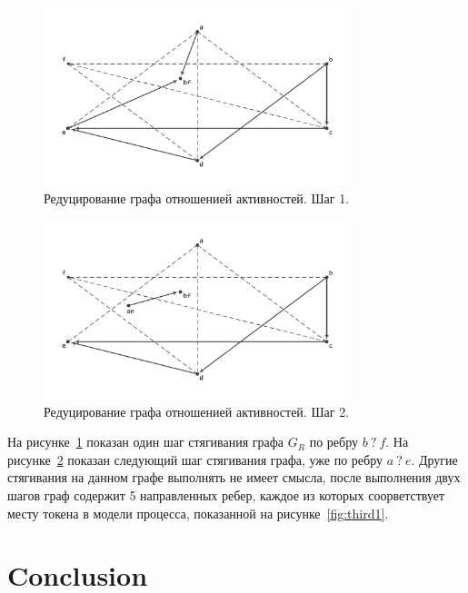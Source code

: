 \documentclass[
11pt,%
tightenlines,%
twoside,%
onecolumn,%
nofloats,%
nobibnotes,%
nofootinbib,%
superscriptaddress,%
noshowpacs,%
centertags]%
{revtex4}
\begin{document}
\begin{figure}[h]
\setcaptionmargin{5mm}
\includegraphics[width=0.8\textwidth]{pics/g_r_reduce1.pdf}
\caption{Редуцирование графа отношенией активностей. Шаг 1.}
\label{fig:g_r_reduce1}
\end{figure}

\begin{figure}[h]
\setcaptionmargin{5mm}
\includegraphics[width=0.8\textwidth]{pics/g_r_reduce2.pdf}
\caption{Редуцирование графа отношенией активностей. Шаг 2.}
\label{fig:g_r_reduce2}
\end{figure}

На рисунке~\ref{fig:g_r_reduce1} показан один шаг стягивания графа $G_R$ по ребру $b \ ? \ f$.
На рисунке~\ref{fig:g_r_reduce2} показан следующий шаг стягивания графа, уже по ребру $a \ ? \ e$.
Другие стягивания на данном графе выполнять не имеет смысла, после выполнения двух шагов граф содержит 5 направленных ребер, каждое из которых соорветствует месту токена в модели процесса, показанной на рисунке~\ref{fig:third1}.

\section{Conclusion}
\end{document}

